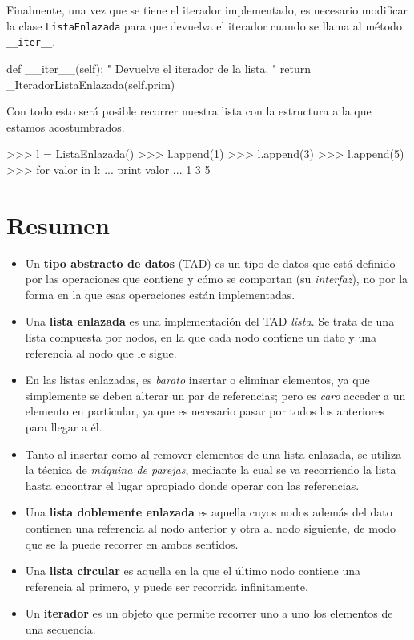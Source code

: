 Finalmente, una vez que se tiene el iterador implementado, es necesario
modificar la clase \lstinline!ListaEnlazada! para que devuelva el iterador
cuando se llama al método \lstinline!__iter__!.

\begin{codigo-python-sn}
    def __iter__(self):
        " Devuelve el iterador de la lista. "
        return _IteradorListaEnlazada(self.prim)
\end{codigo-python-sn}

Con todo esto será posible recorrer nuestra lista con la estructura a la
que estamos acostumbrados.

\begin{codigo-python-sn}
>>> l = ListaEnlazada()
>>> l.append(1)
>>> l.append(3)
>>> l.append(5)
>>> for valor in l:
...     print valor
...
1
3
5
\end{codigo-python-sn}

\section{Resumen}

\begin{itemize}

\item Un {\bf tipo abstracto de datos} (TAD) es un tipo de datos que está
definido por las operaciones que contiene y cómo se comportan (su {\it
interfaz}), no por la forma en la que esas operaciones están implementadas.

\item Una {\bf lista enlazada} es una implementación del TAD {\it lista}.
Se trata de una lista compuesta por nodos, en la que
cada nodo contiene un dato y una referencia al nodo que le sigue.

\item En las listas enlazadas, es {\it barato} insertar o eliminar
elementos, ya que simplemente se deben alterar un par de referencias; pero
es {\it caro} acceder a un elemento en particular, ya que es necesario
pasar por todos los anteriores para llegar a él.

\item Tanto al insertar como al remover elementos de una lista enlazada, se
utiliza la técnica de {\it máquina de parejas}, mediante la cual se va
recorriendo la lista hasta encontrar el lugar apropiado donde operar con
las referencias.

\item Una {\bf lista doblemente enlazada} es aquella cuyos nodos además del
dato contienen una referencia al nodo anterior y otra al nodo siguiente, de
modo que se la puede recorrer en ambos sentidos.

\item Una {\bf lista circular} es aquella en la que el último nodo contiene
una referencia al primero, y puede ser recorrida infinitamente.

\item Un {\bf iterador} es un objeto que permite recorrer uno a uno los
elementos de una secuencia.

\end{itemize}


